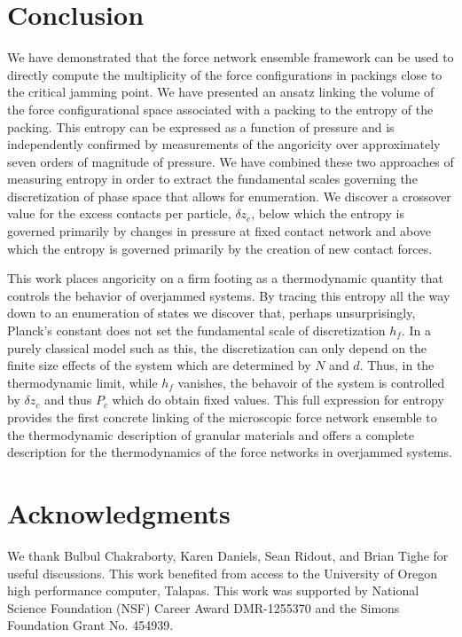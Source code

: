 \section{Conclusion} We have demonstrated that the force network ensemble framework can be used to directly compute the multiplicity of the force configurations in packings close to the critical jamming point. We have presented an ansatz linking the volume of the force configurational space associated with a packing to the entropy of the packing.  This entropy can be expressed as a function of pressure and is independently confirmed by measurements of the angoricity over approximately seven orders of magnitude of pressure.  We have combined these two approaches of measuring entropy in order to extract the fundamental scales governing the discretization of phase space that allows for enumeration. We discover a crossover value for the excess contacts per particle, $\delta z_c$, below which the entropy is governed primarily by changes in pressure at fixed contact network and above which the entropy is governed primarily by the creation of new contact forces.

This work places angoricity on a firm footing as a thermodynamic quantity that controls the behavior of overjammed systems.  By tracing this entropy all the way down to an enumeration of states we discover that, perhaps unsurprisingly, Planck's constant does not set the fundamental scale of discretization $h_f$. In a purely classical model such as this, the discretization can only depend on the finite size effects of the system which are determined by $N$ and $d$. Thus, in the thermodynamic limit, while $h_f$ vanishes, the behavoir of the system is controlled by $\delta z_c$ and thus $P_c$ which do obtain fixed values. This full expression for entropy provides the first concrete linking of the microscopic force network ensemble to the thermodynamic description of granular materials and offers a complete description for the thermodynamics of the force networks in overjammed systems.

\section{Acknowledgments} We thank Bulbul Chakraborty, Karen Daniels, Sean Ridout, and Brian Tighe for useful discussions. This work benefited from access to the University of Oregon high performance computer, Talapas. This work was supported by National Science Foundation (NSF) Career Award DMR-1255370 and the Simons Foundation Grant No. 454939.


%
%

